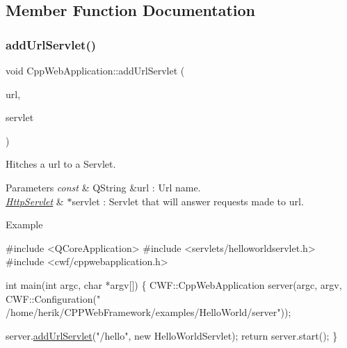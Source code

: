 \subsection{Member Function Documentation}
\mbox{\label{class_cpp_web_application_aa8c0b5330f0133fc478b921f2a05dcec}} 
\subsubsection{\texorpdfstring{add\+Url\+Servlet()}{addUrlServlet()}}
{\footnotesize\ttfamily void Cpp\+Web\+Application\+::add\+Url\+Servlet (\begin{DoxyParamCaption}\item[{const Q\+String \&}]{url,  }\item[{\mbox{\hyperlink{class_http_servlet}{Http\+Servlet}} $\ast$}]{servlet }\end{DoxyParamCaption})}



Hitches a url to a Servlet. 


\begin{DoxyParams}{Parameters}
{\em const} & Q\+String \&url \+: Url name. \\
\hline
{\em \mbox{\hyperlink{class_http_servlet}{Http\+Servlet}}} & $\ast$servlet \+: Servlet that will answer requests made to url. \\
\hline
\end{DoxyParams}
\begin{DoxyParagraph}{Example}

\begin{DoxyCode}
\textcolor{preprocessor}{#include <QCoreApplication>}
\textcolor{preprocessor}{#include <servlets/helloworldservlet.h>}
\textcolor{preprocessor}{#include <cwf/cppwebapplication.h>}

\textcolor{keywordtype}{int} main(\textcolor{keywordtype}{int} argc, \textcolor{keywordtype}{char} *argv[])
\{
     CWF::CppWebApplication server(argc, argv, CWF::Configuration(\textcolor{stringliteral}{"
      /home/herik/CPPWebFramework/examples/HelloWorld/server"}));

     server.\mbox{\hyperlink{class_cpp_web_server_ae94dcf116776b97ec7d5a00cde87c6bd}{addUrlServlet}}(\textcolor{stringliteral}{"/hello"}, \textcolor{keyword}{new} HelloWorldServlet);
     \textcolor{keywordflow}{return} server.start();
\}
\end{DoxyCode}
 
\end{DoxyParagraph}
\mbox{\label{class_cpp_web_application_a1e9f2c789934748d6b7c29ad33e9d7c9}} 
